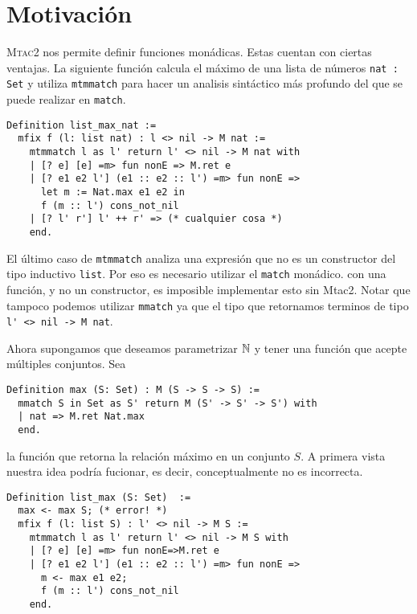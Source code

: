 \chapter{Motivación}\label{ch:motivacion}

\textsc{Mtac2} nos permite definir funciones monádicas. Estas cuentan con ciertas ventajas.
La siguiente función calcula el máximo de una lista de números \lstinline{nat : Set} y utiliza \lstinline{mtmmatch} para hacer un analisis sintáctico más profundo del que se puede realizar en \lstinline{match}. %

\begin{lstlisting}[float=h,frame=tb,caption={Teorema y prueba en Coq},label=lst:list_max_nat]
Definition list_max_nat :=
  mfix f (l: list nat) : l <> nil -> M nat :=
    mtmmatch l as l' return l' <> nil -> M nat with
    | [? e] [e] =m> fun nonE => M.ret e
    | [? e1 e2 l'] (e1 :: e2 :: l') =m> fun nonE =>
      let m := Nat.max e1 e2 in
      f (m :: l') cons_not_nil
    | [? l' r'] l' ++ r' => (* cualquier cosa *) 
    end.
\end{lstlisting}

El último caso de \lstinline{mtmmatch} analiza una expresión que no es un constructor del tipo inductivo \lstinline{list}. Por eso es necesario utilizar el \lstinline{match} monádico.
con una función, y no un constructor, es imposible implementar esto sin Mtac2. Notar que tampoco podemos utilizar \lstinline{mmatch} ya que el tipo que retornamos terminos de tipo \lstinline{l' <> nil -> M nat}.

Ahora supongamos que deseamos parametrizar $\mathbb{N}$ y tener una función que acepte
múltiples conjuntos. Sea
\begin{lstlisting}
Definition max (S: Set) : M (S -> S -> S) :=
  mmatch S in Set as S' return M (S' -> S' -> S') with
  | nat => M.ret Nat.max
  end.
\end{lstlisting}
la función que retorna la relación máximo en un conjunto $S$.
A primera vista nuestra idea podría fucionar, es decir, conceptualmente no es incorrecta.

\begin{lstlisting}
Definition list_max (S: Set)  :=
  max <- max S; (* error! *)
  mfix f (l: list S) : l' <> nil -> M S :=
    mtmmatch l as l' return l' <> nil -> M S with
    | [? e] [e] =m> fun nonE=>M.ret e
    | [? e1 e2 l'] (e1 :: e2 :: l') =m> fun nonE =>
      m <- max e1 e2;
      f (m :: l') cons_not_nil
    end.
\end{lstlisting}

